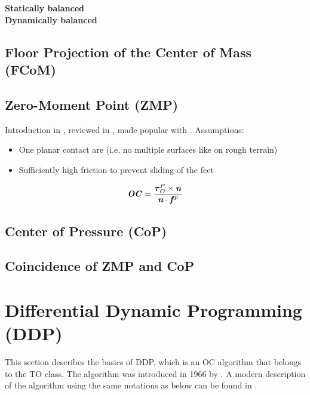 \textbf{Statically balanced}\\

\textbf{Dynamically balanced}
\subsection{Floor Projection of the Center of Mass (FCoM)}
\subsection{Zero-Moment Point (ZMP)}
Introduction in \cite{vukobratovic1972stability}, reviewed in \cite{vukobratovic2004zero}, made popular with \cite{kajita2003biped}.
Assumptions:
\begin{itemize}
\item One planar contact are (i.e. no multiple surfaces like on rough terrain)
\item Sufficiently high friction to prevent sliding of the feet
\end{itemize}
\begin{equation*} 
\bm{\mathit{OC}}=\dfrac{\bm{\mathit{\tau}}_O^P\times\bm{\mathit{n}}}{\bm{\mathit{n}}\cdot\bm{\mathit{f}}^p}
\end{equation*}
\subsection{Center of Pressure (CoP)}
\subsection{Coincidence of ZMP and CoP}


\section{Differential Dynamic Programming (DDP)}\label{sec:DDP}
This section describes the basics of \gls{DDP}, which is an \gls{OC} algorithm that belongs to the \gls{TO} class. The algorithm was introduced in 1966 by \citeauthor{mayne1966} \citep{mayne1966}. A modern description of the algorithm using the same notations as below can be found in \cite{tassa2012synthesis, tassa2014control}.
